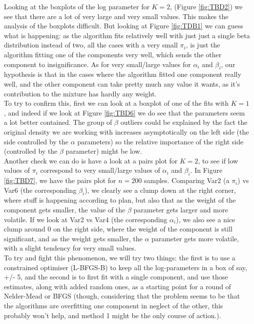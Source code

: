 Looking at the boxplots of the log parameter for $K=2$, (Figure \ref{fig:TBD2}) we see that there are a lot of very large and very small values. This makes the analysis of the boxplots difficult. But looking at Figure \ref{fig:TDB1} we can guess what is happening: as the algorithm fits relatively well with just just a single beta distribution instead of two, all the cases with a very small $\pi_i$, is just the algorithm fitting one of the components very well, which sends the other component to insignificance. As for very small/large values for $\alpha_i$ and $\beta_i$, our hypothesis is that in the cases where the algorithm fitted one component really well, and the other component can take pretty much any value it wants, as it's contribution to the mixture has hardly any weight.
\\

To try to confirm this, first we can look at a boxplot of one of the fits with $K=1$, and indeed if we look at Figure \ref{fig:TBD6} we do see that the parameters seem a lot better contained. The group of $\beta$ outliers could be explained by the fact the original density we are working with increases asymptotically on the left side (the side controlled by the $\alpha$ parameters) so the relative importance of the right side (controlled by the $\beta$ parameter) might be low. 
\\

Another check we can do is have a look at a pairs plot for $K=2$, to see if low values of $\pi_i$ correspond to very small/large values of $\alpha_i$ and $\beta_i$. In Figure \ref{fig:TBD7}, we have the pairs plot for $n=200$ samples. Comparing Var2 (a $\pi_i$) vs Var6 (the corresponding $\beta_i$), we clearly see a clump down at the right corner, where stuff is happening according to plan, but also that as the weight of the component gets smaller, the value of the $\beta$ parameter gets larger and more volatile. If we look at Var2 vs Var4 (the corresponding $\alpha_i$), we also see a nice clump around $0$ on the right side, where the weight of the component is still significant, and as the weight gets smaller, the $\alpha$ parameter gets more volatile, with a slight tendency for very small values.
\\


To try and fight this phenomenon, we will try two things: the first is to use a constrained optimiser (L-BFGS-B) to keep all the log-parameters in a box of say, +/- 5, and the second is to first fit with a single component, and use those estimates, along with added random ones, as a starting point for a round of Nelder-Mead or BFGS (though, considering that the problem seems to be that the algorithms are overfitting one component in neglect of the other, this probably won't help, and method 1 might be the only course of action.).

